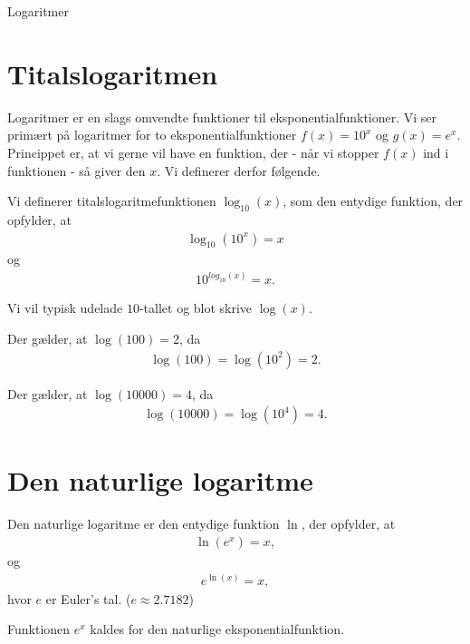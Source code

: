 
\begin{center}
\Huge
Logaritmer
\end{center}
\section*{Titalslogaritmen}
Logaritmer er en slags omvendte funktioner til eksponentialfunktioner. Vi ser primært på logaritmer for to eksponentialfunktioner $f(x) = 10^x$ og $g(x) = e^x$. Princippet er, at vi gerne vil have en funktion, der - når vi stopper $f(x)$ ind i funktionen - så giver den $x$. Vi definerer derfor følgende.
\begin{defn}
Vi definerer titalslogaritmefunktionen $\log_{10}(x)$, som den entydige funktion, der opfylder, at 
\begin{align*}
\log_{10}(10^x) = x
\end{align*}
og 
\begin{align*}
10^{log_{10}(x)} = x.
\end{align*}
\end{defn}
Vi vil typisk udelade $10$-tallet og blot skrive $\log(x)$.

\begin{exa}
Der gælder, at $\log(100) = 2$, da
\begin{align*}
\log(100) = \log(10^2) = 2.
\end{align*}
\end{exa}
\begin{exa}
Der gælder, at $\log(10000) = 4$, da
\begin{align*}
\log(10000) = \log(10^4) = 4.
\end{align*}
\end{exa}

\section*{Den naturlige logaritme}
\begin{defn}
Den naturlige logaritme er den entydige funktion $\ln$, der opfylder, at
\begin{align*}
\ln(e^x) = x, 
\end{align*}
og
\begin{align*}
e^{\ln(x)} = x,
\end{align*}
hvor $e$ er Euler's tal. ($e \approx 2.7182$)
\end{defn}
Funktionen $e^x$ kaldes for den naturlige eksponentialfunktion.

